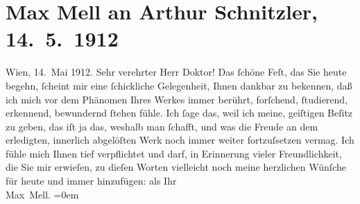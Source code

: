 

         \renewcommand{\erwaehnteOrte}{Orte: Wien, Wittelsbachstraße}
         \renewcommand{\erwaehnteWerke}{}
               \section[Max Mell an Arthur Schnitzler, 14. 5. 1912]{ Max Mell an Arthur Schnitzler, 14. 5. 1912}\nopagebreak{}\rehead{ }\begin{ledgroupsized}[t]{13cm}\normalsize\beginnumbering \toendnotes[C]{\smallbreak\pagebreak[2]} 
\pstart
           \raggedleft{}{\pb}Wien, 14. Mai 1912.\pend
           \pstart{}Sehr verehrter Herr Doktor!\pend\pstart
           Das ſchöne Feſt, das Sie heute begehn, ſcheint mir eine ſchickliche Gelegenheit,
               Ihnen dankbar zu bekennen, daß ich mich vor dem Phänomen Ihres Werkes immer berührt,
               forſchend, ſtudierend, erkennend, bewundernd ſtehen fühle. Ich ſage das, weil ich
               meine, geiſtigen Beſitz zu geben, das iſt ja das, weshalb man ſchafft, und was die
               Freude an dem erledigten, innerlich abgelöſten Werk noch immer weiter fortzuſsetzen
               vermag. Ich fühle mich Ihnen tief verpflichtet und darf, in Erinnerung vieler
               Freundlichkeit, die Sie mir erwieſen, zu dieſen Worten vielleicht noch meine
               herzlichen Wünſche für heute und immer hinzufügen:\pend
           \pstart
           als Ihr{\\[\baselineskip]}\spacefill\mbox{Max Mell.}\pend
           \leftskip=0em{}
         
         \endnumbering{}\end{ledgroupsized}  \newcommand{\dateiname}{L02065}\newcommand{\titel}{Max Mell an Arthur Schnitzler, 14. 5. 1912}\newcommand{\editorInnen}{Martin Anton Müller und Gerd-Hermann Susen}
      